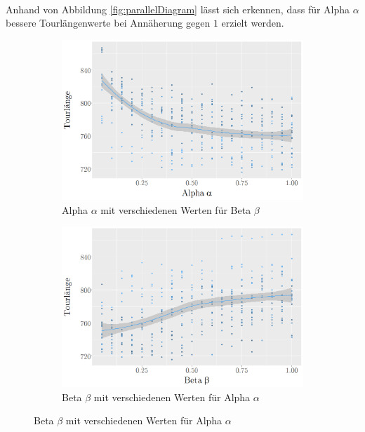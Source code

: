 \documentclass[doktyp=barbeit, sprache=german]{TUBAFarbeiten}
\begin{document}
\\Anhand von Abbildung \ref{fig:parallelDiagram} lässt sich erkennen, dass für Alpha $\alpha$ bessere Tourlängenwerte bei Annäherung gegen $1$ erzielt werden. 
\begin{figure}[!]
        \centering
        \begin{subfigure}[b]{0.475\textwidth}
            \centering
            \includegraphics[width=\textwidth]{images/diagramparallelalpha}
            \caption{Alpha $\alpha$ mit verschiedenen Werten für Beta $\beta$}               
            \label{fig:iterativeAlpha}
        \end{subfigure}
        \hfill
        \begin{subfigure}[b]{0.475\textwidth}  
            \centering 
            \includegraphics[width=\textwidth]{images/diagramparallelbeta}
            \caption{Beta $\beta$ mit verschiedenen Werten für Alpha $\alpha$}   

\end{subfigure}
\end{figure}
\end{document}
